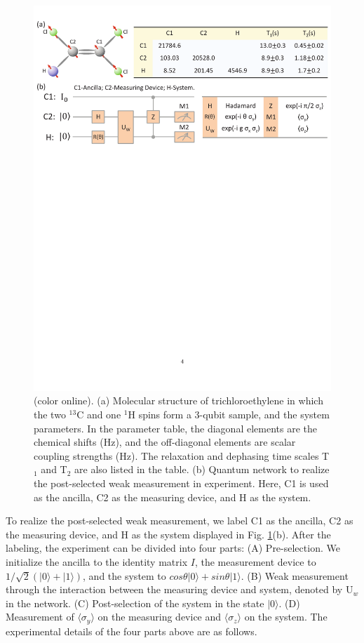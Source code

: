 \documentclass[aps,pra,12pt,onecolumn,showpacs,superscriptaddress,floatfix,footinbib,subfigure]{revtex4}
\begin{document}
\begin{figure}[h] \centering
\includegraphics[width=\columnwidth]{molecule.pdf}
\caption{(color online). (a) Molecular structure of trichloroethylene in which the two $^{13}$C and one $^{1}$H spins form a 3-qubit sample, and the system parameters. In the parameter table, the diagonal elements are the chemical shifts (Hz), and the off-diagonal elements are scalar coupling strengths (Hz). The relaxation and dephasing time scales T$_1$ and T$_2$ are also listed in the table. (b) Quantum network to realize the post-selected weak measurement in experiment. Here, C1 is used as the ancilla, C2 as the measuring device, and H as the system. }\label{molecule}
\end{figure}

 To realize the post-selected weak measurement, we label C1 as the ancilla, C2 as the measuring device, and H as the system displayed in Fig. \ref{molecule}(b). After the labeling, the experiment can be divided into four parts: (A) Pre-selection. We initialize the ancilla to the identity matrix $I$, the measurement device to $1/\sqrt{2}(|0\rangle+|1\rangle) $, and the system to $cos\theta|0\rangle+sin\theta|1\rangle$. (B) Weak measurement through the interaction between the measuring device and system, denoted by U$_w$ in the network. (C) Post-selection of the system in the state $|0\rangle$. (D) Measurement of $\langle \sigma_y \rangle$ on the measuring device and $\langle \sigma_z \rangle$ on the system. The experimental details of the four  parts above are as follows.
\end{document}
